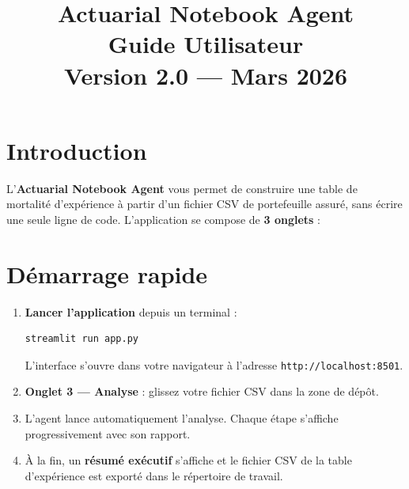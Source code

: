 \documentclass[11pt,a4paper]{article}
\title{%
  \textbf{Actuarial Notebook Agent}\\[0.5em]
  \large Guide Utilisateur\\[0.3em]
  \normalsize Version 2.0 — Mars 2026
}
\author{}
\date{}
\begin{document}
\maketitle
\tableofcontents
\newpage

\section{Introduction}

L'\textbf{Actuarial Notebook Agent} vous permet de construire une table de mortalité
d'expérience à partir d'un fichier CSV de portefeuille assuré, sans écrire une seule
ligne de code. L'application se compose de \textbf{3 onglets} :

\medskip
\begin{center}
\end{center}

\section{Démarrage rapide}

\begin{enumerate}[leftmargin=1.5cm, label=\textbf{Étape \arabic*.}]
  \item \textbf{Lancer l'application} depuis un terminal :
\begin{verbatim}
streamlit run app.py
\end{verbatim}
        L'interface s'ouvre dans votre navigateur à l'adresse
        \texttt{http://localhost:8501}.

  \item \textbf{Onglet 3 — Analyse} : glissez votre fichier CSV dans la zone de dépôt.

  \item L'agent lance automatiquement l'analyse. Chaque étape s'affiche progressivement
        avec son rapport.

  \item À la fin, un \textbf{résumé exécutif} s'affiche et le fichier CSV de la table
        d'expérience est exporté dans le répertoire de travail.
\end{enumerate}
\end{document}
